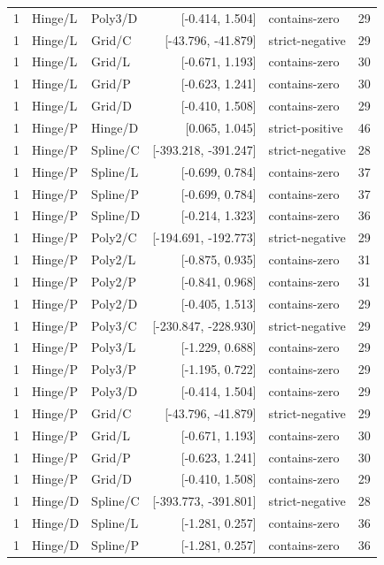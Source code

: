\begin{longtable}{lllrlr}
1 & Hinge/L & Poly3/D & [-0.414, 1.504] & contains-zero & 29 \\
1 & Hinge/L & Grid/C & [-43.796, -41.879] & strict-negative & 29 \\
1 & Hinge/L & Grid/L & [-0.671, 1.193] & contains-zero & 30 \\
1 & Hinge/L & Grid/P & [-0.623, 1.241] & contains-zero & 30 \\
1 & Hinge/L & Grid/D & [-0.410, 1.508] & contains-zero & 29 \\
1 & Hinge/P & Hinge/D & [0.065, 1.045] & strict-positive & 46 \\
1 & Hinge/P & Spline/C & [-393.218, -391.247] & strict-negative & 28 \\
1 & Hinge/P & Spline/L & [-0.699, 0.784] & contains-zero & 37 \\
1 & Hinge/P & Spline/P & [-0.699, 0.784] & contains-zero & 37 \\
1 & Hinge/P & Spline/D & [-0.214, 1.323] & contains-zero & 36 \\
1 & Hinge/P & Poly2/C & [-194.691, -192.773] & strict-negative & 29 \\
1 & Hinge/P & Poly2/L & [-0.875, 0.935] & contains-zero & 31 \\
1 & Hinge/P & Poly2/P & [-0.841, 0.968] & contains-zero & 31 \\
1 & Hinge/P & Poly2/D & [-0.405, 1.513] & contains-zero & 29 \\
1 & Hinge/P & Poly3/C & [-230.847, -228.930] & strict-negative & 29 \\
1 & Hinge/P & Poly3/L & [-1.229, 0.688] & contains-zero & 29 \\
1 & Hinge/P & Poly3/P & [-1.195, 0.722] & contains-zero & 29 \\
1 & Hinge/P & Poly3/D & [-0.414, 1.504] & contains-zero & 29 \\
1 & Hinge/P & Grid/C & [-43.796, -41.879] & strict-negative & 29 \\
1 & Hinge/P & Grid/L & [-0.671, 1.193] & contains-zero & 30 \\
1 & Hinge/P & Grid/P & [-0.623, 1.241] & contains-zero & 30 \\
1 & Hinge/P & Grid/D & [-0.410, 1.508] & contains-zero & 29 \\
1 & Hinge/D & Spline/C & [-393.773, -391.801] & strict-negative & 28 \\
1 & Hinge/D & Spline/L & [-1.281, 0.257] & contains-zero & 36 \\
1 & Hinge/D & Spline/P & [-1.281, 0.257] & contains-zero & 36 \\

\end{longtable}
